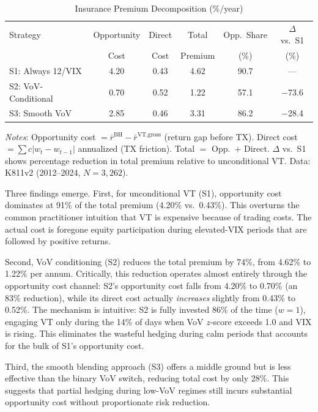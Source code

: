 \documentclass[12pt,a4paper]{article}
\begin{document}
\begin{table}[H]
\centering
\begin{threeparttable}
\caption{Insurance Premium Decomposition (\%/year)}
\label{tab:decomposition}
\begin{tabular}{lccccc}
\toprule
Strategy & Opportunity & Direct & Total & Opp.\ Share & $\Delta$ vs.\ S1 \\
 & Cost & Cost & Premium & (\%) & (\%) \\
\midrule
S1: Always 12/VIX & 4.20 & 0.43 & 4.62 & 90.7 & --- \\
S2: VoV-Conditional & 0.70 & 0.52 & 1.22 & 57.1 & $-$73.6 \\
S3: Smooth VoV & 2.85 & 0.46 & 3.31 & 86.2 & $-$28.4 \\
\bottomrule
\end{tabular}
\begin{tablenotes}
\small
\item \textit{Notes}: Opportunity cost $= \bar{r}^{\text{BH}} - \bar{r}^{\text{VT,gross}}$ (return gap before TX). Direct cost $= \sum c|w_t - w_{t-1}|$ annualized (TX friction). Total $=$ Opp.\ $+$ Direct. $\Delta$ vs.\ S1 shows percentage reduction in total premium relative to unconditional VT. Data: K811v2 (2012--2024, $N = 3{,}262$).
\end{tablenotes}
\end{threeparttable}
\end{table}

Three findings emerge. First, for unconditional VT (S1), opportunity cost dominates at 91\% of the total premium (4.20\% vs.\ 0.43\%). This overturns the common practitioner intuition that VT is expensive because of trading costs. The actual cost is foregone equity participation during elevated-VIX periods that are followed by positive returns.

Second, VoV conditioning (S2) reduces the total premium by 74\%, from 4.62\% to 1.22\% per annum. Critically, this reduction operates almost entirely through the opportunity cost channel: S2's opportunity cost falls from 4.20\% to 0.70\% (an 83\% reduction), while its direct cost actually \emph{increases} slightly from 0.43\% to 0.52\%. The mechanism is intuitive: S2 is fully invested 86\% of the time ($w = 1$), engaging VT only during the 14\% of days when VoV $z$-score exceeds 1.0 and VIX is rising. This eliminates the wasteful hedging during calm periods that accounts for the bulk of S1's opportunity cost.

Third, the smooth blending approach (S3) offers a middle ground but is less effective than the binary VoV switch, reducing total cost by only 28\%. This suggests that partial hedging during low-VoV regimes still incurs substantial opportunity cost without proportionate risk reduction.
\end{document}

